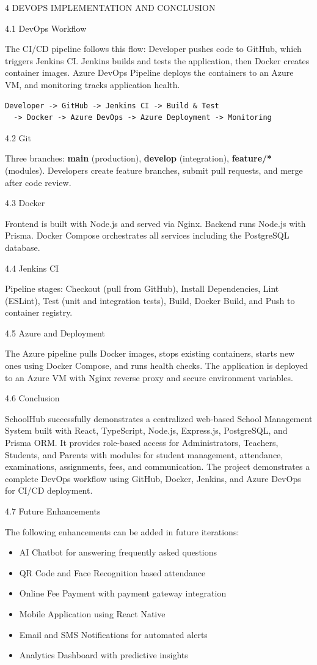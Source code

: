 4  DEVOPS IMPLEMENTATION AND CONCLUSION

4.1  DevOps Workflow

The CI/CD pipeline follows this flow: Developer pushes code to GitHub, which triggers Jenkins CI. Jenkins builds and tests the application, then Docker creates container images. Azure DevOps Pipeline deploys the containers to an Azure VM, and monitoring tracks application health.

\begin{verbatim}
Developer -> GitHub -> Jenkins CI -> Build & Test
  -> Docker -> Azure DevOps -> Azure Deployment -> Monitoring
\end{verbatim}

4.2  Git

Three branches: \textbf{main} (production), \textbf{develop} (integration), \textbf{feature/*} (modules). Developers create feature branches, submit pull requests, and merge after code review.

4.3  Docker

Frontend is built with Node.js and served via Nginx. Backend runs Node.js with Prisma. Docker Compose orchestrates all services including the PostgreSQL database.

4.4  Jenkins CI

Pipeline stages: Checkout (pull from GitHub), Install Dependencies, Lint (ESLint), Test (unit and integration tests), Build, Docker Build, and Push to container registry.

4.5  Azure and Deployment

The Azure pipeline pulls Docker images, stops existing containers, starts new ones using Docker Compose, and runs health checks. The application is deployed to an Azure VM with Nginx reverse proxy and secure environment variables.

4.6  Conclusion

SchoolHub successfully demonstrates a centralized web-based School Management System built with React, TypeScript, Node.js, Express.js, PostgreSQL, and Prisma ORM. It provides role-based access for Administrators, Teachers, Students, and Parents with modules for student management, attendance, examinations, assignments, fees, and communication. The project demonstrates a complete DevOps workflow using GitHub, Docker, Jenkins, and Azure DevOps for CI/CD deployment.

4.7  Future Enhancements

The following enhancements can be added in future iterations:

\begin{itemize}
\item AI Chatbot for answering frequently asked questions
\item QR Code and Face Recognition based attendance
\item Online Fee Payment with payment gateway integration
\item Mobile Application using React Native
\item Email and SMS Notifications for automated alerts
\item Analytics Dashboard with predictive insights
\end{itemize}

